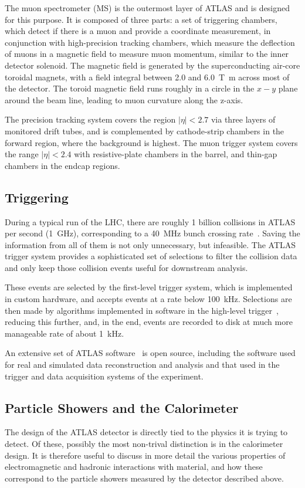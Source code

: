 The muon spectrometer (MS) is the outermost layer of ATLAS and is designed for this purpose. It is composed 
of three parts: a set of triggering chambers, which detect if there is a muon and provide 
a coordinate measurement, in conjunction with high-precision tracking chambers, which measure the deflection of 
muons in a magnetic field to measure muon momentum, similar to the inner detector solenoid. The magnetic 
field is generated by the superconducting air-core toroidal magnets, with a field integral between 
\num{2.0} and \SI{6.0}{\tesla\metre} across most of the detector. The toroid magnetic field runs roughly 
in a circle in the $x-y$ plane around the beam line, leading to muon curvature along the z-axis.

The precision tracking system covers the region \(|\eta| < 2.7\) via three layers of monitored drift 
tubes, and is complemented by cathode-strip chambers in the forward region, where the background is highest.
The muon trigger system covers the range \(|\eta| < 2.4\) with resistive-plate chambers in the barrel, and thin-gap chambers in the endcap regions.

\subsection{Triggering}
During a typical run of the LHC, there are roughly 1 billion collisions in ATLAS per second (\SI{1}{\GHz}), corresponding
to a \SI{40}{\MHz} bunch crossing rate~\cite{FactSheet}.
Saving the information from all of them is not only unnecessary, but infeasible. The ATLAS trigger 
system provides a sophisticated set of selections to filter the collision data and only keep those 
collision events useful for downstream analysis.

These events are selected by the first-level trigger system, which is implemented in custom hardware,
and accepts events at a rate below \SI{100}{\kHz}. Selections are then made by algorithms implemented in software 
in the high-level trigger~\cite{TRIG-2016-01}, reducing this further, and, in the end, events 
are recorded to disk at much more manageable rate of about \SI{1}{\kHz}.

An extensive set of ATLAS software~\cite{ATL-SOFT-PUB-2021-001} is open source, including the software used for real and simulated data reconstruction and analysis and that used in the trigger and data acquisition systems of the experiment.

\subsection{Particle Showers and the Calorimeter}
The design of the ATLAS detector is directly tied to the physics it is trying to detect. Of these, 
possibly the most non-trival distinction is in the calorimeter design. It is therefore useful to discuss in more 
detail the various properties of electromagnetic and hadronic interactions with material, and how these 
correspond to the particle showers measured by the detector described above. 

